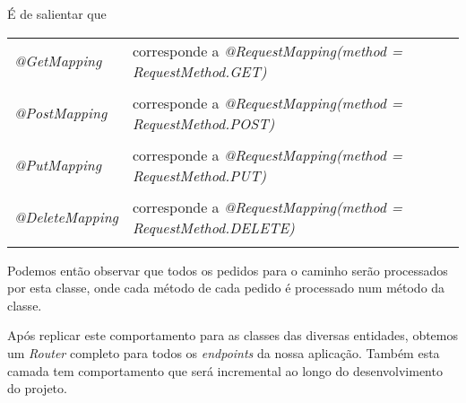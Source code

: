 É de salientar que\\
\begin{tabular}{ll}\\
	\emph{@GetMapping} & corresponde a \emph{@RequestMapping(method = RequestMethod.GET)}\\
	\\
	\emph{@PostMapping} & corresponde a \emph{@RequestMapping(method = RequestMethod.POST)}\\
	\\
	\emph{@PutMapping} & corresponde a \emph{@RequestMapping(method = RequestMethod.PUT)}\\
	\\
	\emph{@DeleteMapping} & corresponde a \emph{@RequestMapping(method = RequestMethod.DELETE)}\\
	\\
\end{tabular}

Podemos então observar que todos os pedidos para o caminho \emph{\event} serão processados por esta classe, onde cada método de cada pedido é processado num método da classe.

Após replicar este comportamento para as classes das diversas entidades, obtemos um \emph{Router} completo para todos os \emph{endpoints} da nossa aplicação. Também esta camada tem comportamento que será incremental ao longo do desenvolvimento do projeto.
